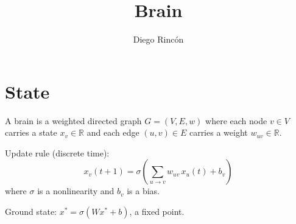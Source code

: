\documentclass[12pt]{article}
\title{Brain}
\author{Diego Rincón}
\date{}
\begin{document}
\maketitle

\section*{State}

A brain is a weighted directed graph $G = (V, E, w)$ where each node
$v \in V$ carries a state $x_v \in \mathbb{R}$ and each edge
$(u,v) \in E$ carries a weight $w_{uv} \in \mathbb{R}$.

Update rule (discrete time):
\[
x_v(t+1) = \sigma\!\left(\sum_{u \to v} w_{uv}\, x_u(t) + b_v\right)
\]
where $\sigma$ is a nonlinearity and $b_v$ is a bias.

Ground state: $x^* = \sigma(Wx^* + b)$, a fixed point.

\bigskip
\end{document}
